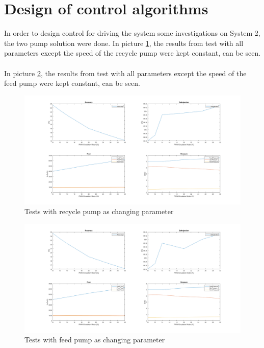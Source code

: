 \section{Design of control algorithms}
In order to design control for driving the system some investigations on System 2, the two pump solution were done. In picture \ref{fig:PreTestReg1}, the results from test with all parameters except the speed of the recycle pump were kept constant, can be seen. \\
\\
In picture \ref{fig:PreTestReg3}, the results from test with all parameters except the speed of the feed pump were kept constant, can be seen.

\begin{figure}[h]
    \centering
    \includegraphics[width=1.65\textwidth, angle = 270]{PreTestReg1.png}
    \caption{Tests with recycle pump as changing parameter}
    \label{fig:PreTestReg1}
\end{figure}

\begin{figure}[h]
    \centering 
    \includegraphics[width=1.65\textwidth, angle=270]{PreTestReg3.png}
    \caption{Tests with feed pump as changing parameter}
    \label{fig:PreTestReg3}
\end{figure}





